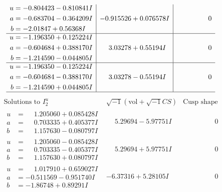 \documentclass[1p]{elsarticle_modified}
\theoremstyle{definition}
\newcommand{\I}{\sqrt{-1}}
\begin{document}
$$\begin{array}{c|c|c}
\begin{aligned}
u &= -0.804423 - 0.810841 I \\
a &= -0.683704 - 0.364209 I \\
b &= -2.01847 + 0.56368 I\end{aligned}
 & -0.915526 + 0.076578 I & \phantom{-0.000000 } 0 \\ \hline\begin{aligned}
u &= -1.196350 + 0.125224 I \\
a &= -0.604684 + 0.388170 I \\
b &= -1.214590 - 0.044805 I\end{aligned}
 & \phantom{-}3.03278 + 0.55194 I & \phantom{-0.000000 } 0 \\ \hline\begin{aligned}
u &= -1.196350 - 0.125224 I \\
a &= -0.604684 - 0.388170 I \\
b &= -1.214590 + 0.044805 I\end{aligned}
 & \phantom{-}3.03278 - 0.55194 I & \phantom{-0.000000 } 0\\
 \hline 
 \end{array}$$\newpage$$\begin{array}{c|c|c}  
\text{Solutions to }I^u_{2}& \I (\text{vol} + \sqrt{-1}CS) & \text{Cusp shape}\\
 \hline 
\begin{aligned}
u &= \phantom{-}1.205060 + 0.085428 I \\
a &= \phantom{-}0.703335 + 0.405377 I \\
b &= \phantom{-}1.157630 - 0.080797 I\end{aligned}
 & \phantom{-}5.29694 - 5.97751 I & \phantom{-0.000000 } 0 \\ \hline\begin{aligned}
u &= \phantom{-}1.205060 - 0.085428 I \\
a &= \phantom{-}0.703335 - 0.405377 I \\
b &= \phantom{-}1.157630 + 0.080797 I\end{aligned}
 & \phantom{-}5.29694 + 5.97751 I & \phantom{-0.000000 } 0 \\ \hline\begin{aligned}
u &= \phantom{-}1.017910 + 0.659027 I \\
a &= -0.511569 - 0.951740 I \\
b &= -1.86748 + 0.89291 I\end{aligned}
 & -6.37316 + 5.28105 I & \phantom{-0.000000 } 0 \\ \hline\begin{aligned}

\end{aligned}
\end{array}$$
\end{document}

